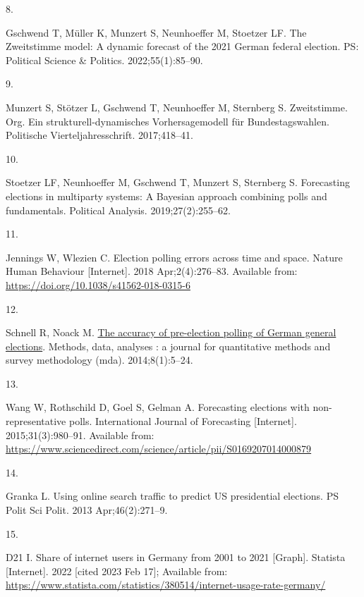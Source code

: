 \documentclass[
  letterpaper,
  DIV=11,
  numbers=noendperiod]{scrartcl}
\newlength{\cslhangindent}
\newlength{\csllabelwidth}
\newlength{\cslentryspacingunit} %
\newenvironment{CSLReferences}[2] %
 {%
  \setlength{\parindent}{0pt}
  \ifodd #1
  \let\oldpar\par
  \def\par{\hangindent=\cslhangindent\oldpar}
  \fi
  \setlength{\parskip}{#2\cslentryspacingunit}
 }%
 {}
\newcommand{\CSLLeftMargin}[1]{\parbox[t]{\csllabelwidth}{#1}}
\newcommand{\CSLRightInline}[1]{\parbox[t]{\linewidth - \csllabelwidth}{#1}\break}
\begin{document}
\begin{CSLReferences}{0}{0}
\leavevmode{}%
\CSLLeftMargin{8. }%
\CSLRightInline{Gschwend T, Müller K, Munzert S, Neunhoeffer M, Stoetzer
LF. The {Zweitstimme} model: {A} dynamic forecast of the 2021 {German}
federal election. PS: Political Science \& Politics. 2022;55(1):85--90.
}

\leavevmode{}%
\CSLLeftMargin{9. }%
\CSLRightInline{Munzert S, Stötzer L, Gschwend T, Neunhoeffer M,
Sternberg S. Zweitstimme. Org. {Ein} strukturell-dynamisches
{Vorhersagemodell} für {Bundestagswahlen}. Politische
Vierteljahresschrift. 2017;418--41. }

\leavevmode{}%
\CSLLeftMargin{10. }%
\CSLRightInline{Stoetzer LF, Neunhoeffer M, Gschwend T, Munzert S,
Sternberg S. Forecasting elections in multiparty systems: A {Bayesian}
approach combining polls and fundamentals. Political Analysis.
2019;27(2):255--62. }

\leavevmode{}%
\CSLLeftMargin{11. }%
\CSLRightInline{Jennings W, Wlezien C. Election polling errors across
time and space. Nature Human Behaviour {[}Internet{]}. 2018
Apr;2(4):276--83. Available from:
\url{https://doi.org/10.1038/s41562-018-0315-6}}

\leavevmode{}%
\CSLLeftMargin{12. }%
\CSLRightInline{Schnell R, Noack M.
\href{https://doi.org/10.12758/mda.2014.001}{The accuracy of
pre-election polling of {German} general elections}. Methods, data,
analyses : a journal for quantitative methods and survey methodology
(mda). 2014;8(1):5--24. }

\leavevmode{}%
\CSLLeftMargin{13. }%
\CSLRightInline{Wang W, Rothschild D, Goel S, Gelman A. Forecasting
elections with non-representative polls. International Journal of
Forecasting {[}Internet{]}. 2015;31(3):980--91. Available from:
\url{https://www.sciencedirect.com/science/article/pii/S0169207014000879}}

\leavevmode{}%
\CSLLeftMargin{14. }%
\CSLRightInline{Granka L. Using online search traffic to predict {US}
presidential elections. PS Polit Sci Polit. 2013 Apr;46(2):271--9. }

\leavevmode{}%
\CSLLeftMargin{15. }%
\CSLRightInline{D21 I. Share of internet users in {Germany} from 2001 to
2021 {[}{Graph}{]}. Statista {[}Internet{]}. 2022 {[}cited 2023 Feb
17{]}; Available from:
\url{https://www.statista.com/statistics/380514/internet-usage-rate-germany/}}


\end{CSLReferences}
\end{document}
